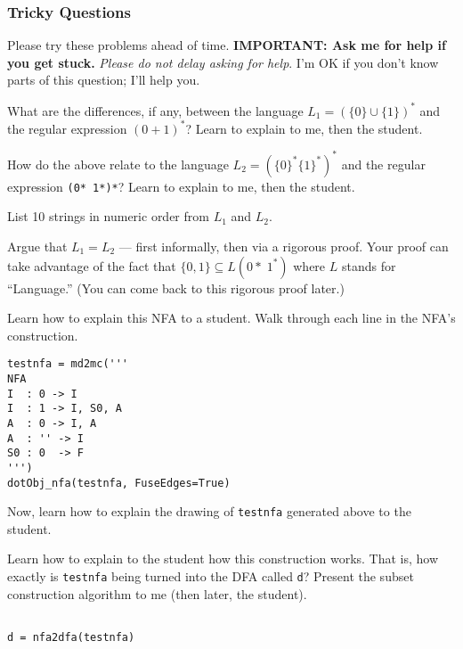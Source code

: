 \documentclass[12pt]{article}
\begin{document}
\subsubsection*{Tricky Questions}

\noindent Please try these problems ahead of time.
          {\bf IMPORTANT: Ask me for help if you get stuck.} {\em Please do not delay asking
          for help}.
          I'm OK if you don't know parts of this question; I'll help you. 

\begin{compactenum}

\item What are the differences, if any,
  between the language
  $L_1= (\{0\}\cup\{1\})^*$
  and the regular expression
  $(0+1)^*$? Learn to explain to me, then the student.

\item  How do the above relate to the language
  $L_2= (\{0\}^* \{1\}^*)^*$
  and the regular expression
  {\tt (0* 1*)*}? Learn to explain to me, then the student.

\item List 10 strings in numeric order from $L_1$ and $L_2$.

\item Argue that $L_1 = L_2$ --- first informally, then via a rigorous proof.
  Your proof can take advantage of the fact that $\{0,1\}\subseteq L(0*\; 1^*)$
  where $L$ stands for ``Language.'' (You can come back to this rigorous proof later.)

  
\item  Learn how to explain this NFA to a student. Walk through each line in the
  NFA's construction.
\begin{verbatim}
testnfa = md2mc('''
NFA
I  : 0 -> I
I  : 1 -> I, S0, A
A  : 0 -> I, A
A  : '' -> I
S0 : 0  -> F
''')
dotObj_nfa(testnfa, FuseEdges=True)
 \end{verbatim}

\item Now, learn how to explain the drawing of {\tt testnfa} generated above to the student.

\item Learn how to explain to the student how this construction works. That is, how exactly is
{\tt testnfa} being turned into the DFA called {\tt d}? Present
the subset construction
algorithm to me (then later, the student).
\begin{verbatim}

d = nfa2dfa(testnfa)


\end{verbatim}
\end{compactenum}
\end{document}
